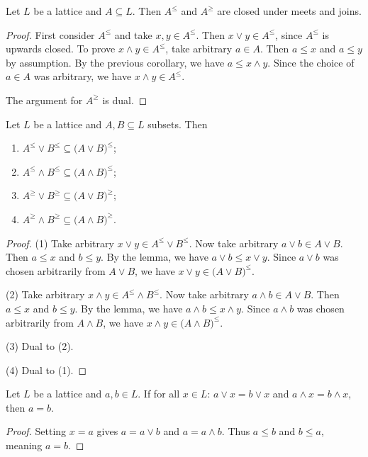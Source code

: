 \begin{corollary} \label{boundsSetsClosedUnderLatticeOperations}
Let $L$ be a lattice and $A\subseteq L$. Then $A^\leq$ and $A^\geq$ are closed under meets and joins.
\end{corollary}
\begin{proof}
First consider $A^\leq$ and take $x,y\in A^\leq$. Then $x\vee y \in A^\leq$, since $A^\leq$ is upwards closed. To prove $x\wedge y \in A^\leq$, take arbitrary $a\in A$. Then $a \leq x$ and $a\leq y$ by assumption. By the previous corollary, we have $a \leq x\wedge y$. Since the choice of $a\in A$ was arbitrary, we have $x\wedge y \in A^\leq$.

The argument for $A^\geq$ is dual.
\end{proof}
\begin{corollary} \label{orderPolarOfLatticeOperations}
Let $L$ be a lattice and $A,B\subseteq L$ subsets. Then
\begin{enumerate}
\item $A^\leq \vee B^\leq \subseteq \big(A\vee B\big)^\leq$;
\item $A^\leq \wedge B^\leq \subseteq \big(A\wedge B\big)^\leq$;
\item $A^\geq \vee B^\geq \subseteq \big(A\vee B\big)^\geq$;
\item $A^\geq \wedge B^\geq \subseteq \big(A\wedge B\big)^\geq$.
\end{enumerate}
\end{corollary}
\begin{proof}
(1) Take arbitrary $x\vee y \in A^\leq \vee B^\leq$. Now take arbitrary $a\vee b\in A\vee B$. Then $a \leq x$ and $b\leq y$. By the lemma, we have $a\vee b \leq x\vee y$. Since $a\vee b$ was chosen arbitrarily from $A\vee B$, we have $x\vee y \in \big(A\vee B\big)^\leq$.

(2) Take arbitrary $x\wedge y \in A^\leq \wedge B^\leq$. Now take arbitrary $a\wedge b\in A\vee B$. Then $a \leq x$ and $b\leq y$. By the lemma, we have $a\wedge b \leq x\wedge y$. Since $a\wedge b$ was chosen arbitrarily from $A\wedge B$, we have $x\wedge y \in \big(A\wedge B\big)^\leq$.

(3) Dual to (2).

(4) Dual to (1).
\end{proof}


\begin{lemma} \label{cancellationGeneralLattices}
Let $L$ be a lattice and $a,b\in L$. If for all $x\in L$: $a\vee x = b\vee x$ and $a\wedge x = b\wedge x$, then $a = b$.
\end{lemma}
\begin{proof}
Setting $x = a$ gives $a = a\vee b$ and $a = a\wedge b$. Thus $a \leq b$ and $b \leq a$, meaning $a = b$.
\end{proof}

